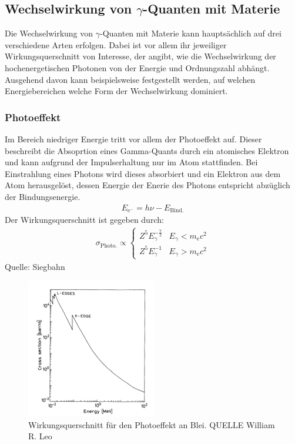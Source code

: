 \documentclass[11pt, a4paper]{article}
\numberwithin{equation}{section}
\begin{document}
\subsection{Wechselwirkung von $\gamma$-Quanten mit Materie}

Die Wechselwirkung von $\gamma$-Quanten mit Materie kann hauptsächlich auf drei verschiedene Arten erfolgen.
Dabei ist vor allem ihr jeweiliger Wirkungsquerschnitt von Interesse, der angibt, wie die Wechselwirkung der hochenergetischen Photonen von der Energie und Ordnungszahl abhängt.
Ausgehend davon kann beispielsweise festgestellt werden, auf welchen Energiebereichen welche Form der Wechselwirkung dominiert.

\subsubsection{Photoeffekt}
\label{sec:theo_photoeffekt}
Im Bereich niedriger Energie tritt vor allem der Photoeffekt auf.
Dieser beschreibt die Absoprtion eines Gamma-Quants durch ein atomisches Elektron und kann aufgrund der Impulserhaltung nur im Atom stattfinden.
Bei Einstrahlung eines Photons wird dieses absorbiert und ein Elektron aus dem Atom herausgelöst, dessen Energie der Enerie des Photons entspricht abzüglich der Bindungsenergie.
\begin{align*}
E_\mathrm{e^{-}} = h \nu - E_\mathrm{Bind.}
\end{align*}
Der Wirkungsquerschnitt ist gegeben durch:
\begin{align*}
	\sigma_\mathrm{Photo.} \propto
	\begin{cases}
		Z^5 E_\gamma^{-\frac{7}{2}} & E_\gamma < m_\mathrm{e} c^2 \\
		Z^5 E_\gamma^{-1} & E_\gamma > m_\mathrm{e} c^2
	\end{cases}
\end{align*}
Quelle: Siegbahn
\begin{figure}[h]
	\centering
	\includegraphics{./figures/photoeffekt.png}
	\caption{Wirkungsquerschnitt für den Photoeffekt an Blei. QUELLE William R. Leo}
	\label{fig:photoeffekt}
\end{figure}
\end{document}
